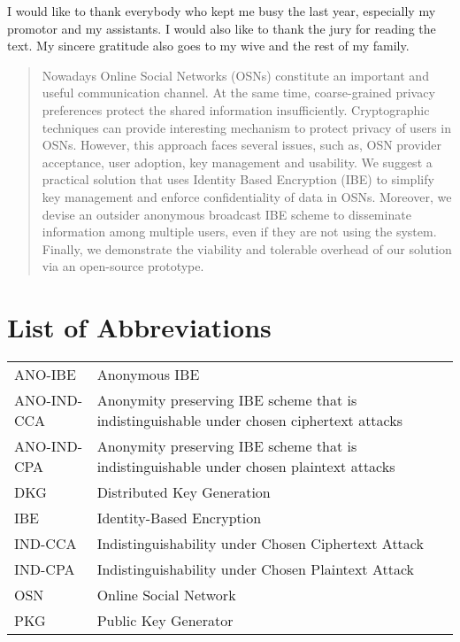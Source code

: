 \documentclass[master=eelt,masteroption=em]{kulemt}
\theoremstyle{plain}
\theoremstyle{definition}
\begin{document}

\begin{preface}
  I would like to thank everybody who kept me busy the last year,
  especially my promotor and my assistants. I would also like to thank the
  jury for reading the text. My sincere gratitude also goes to my wive and
  the rest of my family.
\end{preface}

\tableofcontents*

\begin{abstract}
  Nowadays Online Social Networks (OSNs) constitute an important and useful communication channel. At the same time, coarse-grained privacy preferences protect the shared information insufficiently. Cryptographic techniques can provide interesting mechanism to protect privacy of users in OSNs. However, this approach faces several issues, such as, OSN provider acceptance, user adoption, key management and usability. We suggest a practical solution that uses Identity Based Encryption (IBE) to simplify key management and enforce confidentiality of data in OSNs. Moreover, we devise an outsider anonymous broadcast IBE scheme to disseminate information among multiple users, even if they are not using the system. Finally, we demonstrate the viability and tolerable overhead of our solution via an open-source prototype.

\end{abstract}

\listoffiguresandtables
\chapter{List of Abbreviations}
\begin{flushleft}
  \renewcommand{\arraystretch}{1.1}
  \begin{tabularx}{\textwidth}{@{}p{30mm}X@{}}
    ANO-IBE & Anonymous IBE \\
    ANO-IND-CCA & Anonymity preserving IBE scheme that is indistinguishable under chosen ciphertext attacks \\ 
    ANO-IND-CPA & Anonymity preserving IBE scheme that is indistinguishable under chosen plaintext attacks \\
    DKG   & Distributed Key Generation \\
    IBE   & Identity-Based Encryption \\
    IND-CCA & Indistinguishability under Chosen Ciphertext Attack \\
    IND-CPA  & Indistinguishability under Chosen Plaintext Attack  \\
    OSN & Online Social Network \\
    PKG   & Public Key Generator \\
  \end{tabularx}
\end{flushleft}
\end{document}
